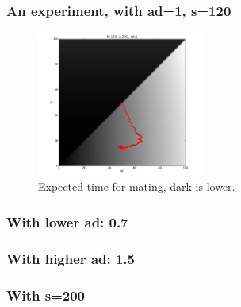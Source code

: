 \documentclass{beamer}
\begin{document}
\begin{frame}
\frametitle{An experiment, with ad=1, s=120}
\begin{figure}
\includegraphics[width=0.5\textwidth]{120_1_traj.png}
\caption{Expected time for mating, dark is lower.}
\end{figure}
\end{frame}

\begin{frame}
\frametitle{With lower ad: 0.7}

\end{frame}

\begin{frame}
\frametitle{With higher ad: 1.5}

\end{frame}

\begin{frame}
\frametitle{With s=200}

\end{frame}

\end{document}
